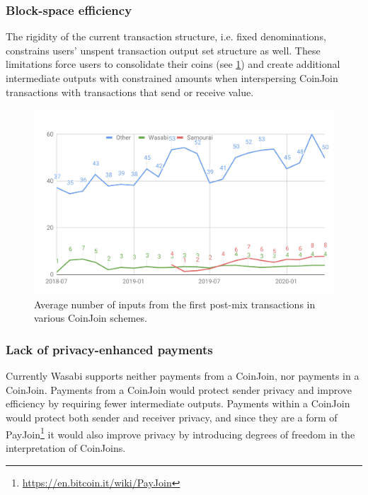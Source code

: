 \documentclass{article}
\begin{document}
\subsubsection{Block-space efficiency}

The rigidity of the current transaction structure, i.e. fixed denominations, constrains users' unspent transaction output set structure as well. These limitations force users to consolidate their coins (see \cref{fig:postmixmerging}) and create additional intermediate outputs with constrained amounts when interspersing CoinJoin transactions with transactions that send or receive value.

\begin{figure}[h!]
    \centering
    \includegraphics[scale=0.4]{Figures/postMixInputMerging.pdf}
    \caption[]{Average number of inputs from the first post-mix transactions in various CoinJoin schemes.\footnotemark}
    \label{fig:postmixmerging}
\end{figure}


\subsubsection{Lack of privacy-enhanced payments} Currently Wasabi supports neither payments from a CoinJoin, nor payments in a CoinJoin. Payments from a CoinJoin would protect sender privacy and improve efficiency by requiring fewer intermediate outputs. Payments within a CoinJoin would protect both sender and receiver privacy, and since they are a form of PayJoin\footnote{\url{https://en.bitcoin.it/wiki/PayJoin}} it would also improve privacy by introducing degrees of freedom in the interpretation of CoinJoins.
\end{document}
